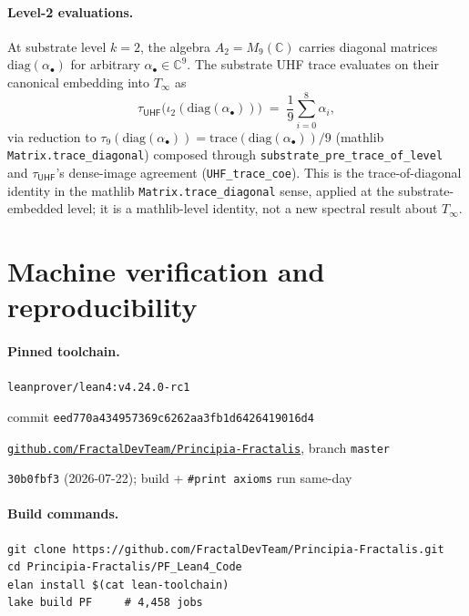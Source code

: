 \documentclass[11pt,a4paper]{amsart}
\theoremstyle{plain}
\theoremstyle{definition}
\begin{document}
\paragraph{Level-2 evaluations.} At substrate level $k = 2$, the algebra $A_2 = M_9(\mathbb{C})$ carries diagonal matrices $\mathrm{diag}(\alpha_\bullet)$ for arbitrary $\alpha_\bullet \in \mathbb{C}^9$. The substrate UHF trace evaluates on their canonical embedding into $T_\infty$ as
\[
\tau_{\textsf{UHF}}\bigl(\iota_2(\mathrm{diag}(\alpha_\bullet))\bigr) \;=\; \frac{1}{9} \sum_{i=0}^{8} \alpha_i,
\]
via reduction to $\tau_9(\mathrm{diag}(\alpha_\bullet)) = \mathrm{trace}(\mathrm{diag}(\alpha_\bullet))/9$ (mathlib \texttt{Matrix.trace\_diagonal}) composed through \texttt{substrate\_pre\_trace\_of\_level} and $\tau_{\textsf{UHF}}$'s dense-image agreement (\texttt{UHF\_trace\_coe}). This is the trace-of-diagonal identity in the mathlib \texttt{Matrix.trace\_diagonal} sense, applied at the substrate-embedded level; it is a mathlib-level identity, not a new spectral result about $T_\infty$.

\section{Machine verification and reproducibility}\label{sec:reproducibility}

\paragraph{Pinned toolchain.}
\begin{description}[font=\normalfont\bfseries,leftmargin=2em,itemsep=2pt]
\item[Lean toolchain] \texttt{leanprover/lean4:v4.24.0-rc1}
\item[mathlib revision] commit \texttt{eed770a434957369c6262aa3fb1d6426419016d4}
\item[Repository] \href{https://github.com/FractalDevTeam/Principia-Fractalis}{\texttt{github.com/FractalDevTeam/Principia-Fractalis}}, branch \texttt{master}
\item[HEAD reference (verified)] \texttt{30b0fbf3} (2026-07-22); build + \texttt{\#print axioms} run same-day
\end{description}

\paragraph{Build commands.}
\begin{verbatim}
git clone https://github.com/FractalDevTeam/Principia-Fractalis.git
cd Principia-Fractalis/PF_Lean4_Code
elan install $(cat lean-toolchain)
lake build PF     # 4,458 jobs
\end{verbatim}
\end{document}
